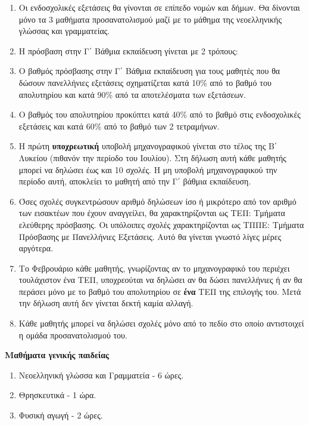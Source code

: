 \documentclass[twoside,nofonts,internet,math,spyros]{Aithsh-gnwsh}
\begin{document}
\begin{enumerate}[resume]
\item Οι ενδοσχολικές εξετάσεις θα γίνονται σε επίπεδο νομών και δήμων. Θα δίνονται μόνο τα 3 μαθήματα προσανατολισμού μαζί με το μάθημα της νεοελληνικής γλώσσας και γραμματείας.
\item Η πρόσβαση στην Γ΄ Βάθμια εκπαίδευση γίνεται με 2 τρόπους:
\item Ο βαθμός πρόσβασης στην Γ΄ Βάθμια εκπαίδευση για τους μαθητές που θα δώσουν πανελλήνιες εξετάσεις σχηματίζεται κατά 10\% από το βαθμό του απολυτηρίου και κατά 90\% από τα αποτελέσματα των εξετάσεων.
\item Ο βαθμός του απολυτηρίου προκύπτει κατά 40\% από το βαθμό στις ενδοσχολικές εξετάσεις και κατά 60\% από το βαθμό των 2 τετραμήνων.
\item Η πρώτη \textbf{υποχρεωτική} υποβολή μηχανογραφικού γίνεται στο τέλος της Β΄ Λυκείου (πιθανόν την περίοδο του Ιουλίου). Στη δήλωση αυτή κάθε μαθητής μπορεί να δηλώσει έως και 10 σχολές. Η μη υποβολή μηχανογραφικού την περίοδο αυτή, αποκλείει το μαθητή από την Γ΄ βάθμια εκπαίδευση.
\item Όσες σχολές συγκεντρώσουν αριθμό δηλώσεων ίσο ή μικρότερο από τον αριθμό των εισακτέων που έχουν αναγγείλει, θα χαρακτηρίζονται ως ΤΕΠ: Τμήματα ελεύθερης πρόσβασης. Οι υπόλοιπες σχολές χαρακτηρίζονται ως ΤΠΠΕ: Τμήματα Πρόσβασης με Πανελλήνιες Εξετάσεις. Αυτό θα γίνεται γνωστό λίγες μέρες αργότερα.
\item Το Φεβρουάριο κάθε μαθητής, γνωρίζοντας αν το μηχανογραφικό του περιέχει τουλάχιστον ένα ΤΕΠ, υποχρεούται να δηλώσει αν θα δώσει πανελλήνιες ή αν θα περάσει μόνο με το βαθμό του απολυτηρίου σε \textbf{ένα} ΤΕΠ της επιλογής του. Μετά την δήλωση αυτή δεν γίνεται δεκτή καμία αλλαγή.
\item Κάθε μαθητής μπορεί να δηλώσει σχολές μόνο από το πεδίο στο οποίο αντιστοιχεί η ομάδα προσανατολισμού του.
\end{enumerate}
\begin{center}
{\large \textbf{Μαθήματα γενικής παιδείας}}
\end{center}
\begin{enumerate}
\item Νεοελληνική γλώσσα και Γραμματεία - 6 ώρες.
\item Θρησκευτικά - 1 ώρα.
\item Φυσική αγωγή - 2 ώρες.
\end{enumerate}
\end{document}
